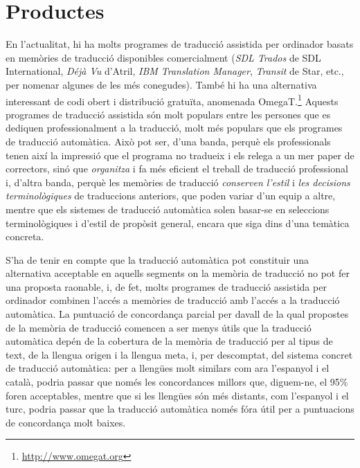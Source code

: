 


\section{Productes}

En l'actualitat, hi ha molts programes de traducció assistida per
ordinador basats en memòries de traducció disponibles comercialment
(\emph{SDL Trados} de SDL International, \emph{Déjà Vu} d'Atril,
\emph{IBM Translation Manager}, \emph{Transit} de Star, etc., per
nomenar algunes de les més conegudes). També hi ha una alternativa
interessant de codi obert i distribució gratuïta, anomenada
OmegaT.\footnote{\url{http://www.omegat.org}} Aquests programes de
traducció assistida són molt populars entre les persones que es
dediquen professionalment a la traducció, molt més populars que els
programes de traducció automàtica. Això pot ser, d'una banda, perquè
els professionals tenen així la impressió que el programa no tradueix
i els relega a un mer paper de correctors, sinó que \emph{organitza} i
fa més eficient el treball de traducció professional i, d'altra banda,
perquè les memòries de traducció \emph{conserven l'estil} i \emph{les
  decisions terminològiques} de traduccions anteriors, que poden
variar d'un equip a altre, mentre que els sistemes de traducció
automàtica solen basar-se en seleccions terminològiques i d'estil de
propòsit general, encara que siga dins d'una temàtica concreta.

S'ha de tenir en compte que la traducció automàtica pot constituir una
alternativa acceptable en aquells segments on la memòria de traducció
no pot fer una proposta raonable, i, de fet, molts programes de
traducció assistida per ordinador combinen l'accés a memòries de
traducció amb l'accés a la traducció automàtica. La puntuació de concordança parcial per davall de la qual  
propostes de la memòria de traducció comencen a ser menys útils que la
traducció automàtica depén de la cobertura de la memòria de traducció
per al tipus de text, de la llengua origen i la llengua meta, i, per
descomptat, del sistema concret de traducció automàtica: per a
llengües molt similars com ara l'espanyol i el català, podria passar
que només les concordances millors que, diguem-ne, el 95\% foren
acceptables, mentre que si les llengües són més distants, com
l'espanyol i el turc, podria passar que la traducció automàtica només
fóra útil per a puntuacions de concordança molt baixes.

